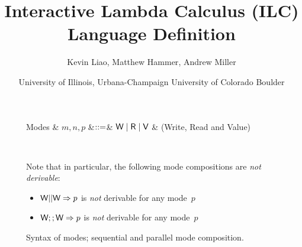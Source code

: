 \documentclass[10pt]{article}
\begin{document}
\title{Interactive Lambda Calculus (ILC) Language Definition}
\author{Kevin Liao\textsuperscript{\textasteriskcentered},
        Matthew Hammer\textsuperscript{\textdagger},
        Andrew Miller\textsuperscript{\textasteriskcentered}}
\date{\textsuperscript{\textasteriskcentered} University of Illinois,
  Urbana-Champaign \hspace{0.5cm} \textsuperscript{\textdagger} University of
  Colorado Boulder}

\maketitle
\thispagestyle{empty}

\begin{figure}[htbp]
{
  \centering

\begin{grammar}
  Modes & $m,n,p$ &$\mathrel{::=}$& $\textsf{W} \mathrel{\mid} \textsf{R} \mathrel{\mid} \textsf{V}$ & (Write, Read and Value) 
\end{grammar}

\\[2mm]
}
Note that in particular, the following mode compositions are \emph{not derivable}:
\begin{itemize}
\item $\textsf{W} || \textsf{W} => p$ is \emph{not} derivable for any mode~$p$
\item $\textsf{W} ;; \textsf{W} => p$ is \emph{not} derivable for any mode~$p$
\end{itemize}
\caption{Syntax of modes; sequential and parallel mode composition.}
\label{fig:expr}
\end{figure}
\end{document}
